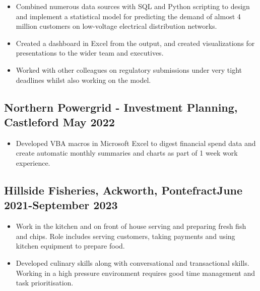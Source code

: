\documentclass[9pt]{extarticle}
\begin{document}
\begin{minipage}{0.65\textwidth}
	\begin{itemize}
		\item Combined numerous data sources with SQL and Python scripting to design and implement a statistical model for predicting the demand of almost 4 million customers on low-voltage electrical distribution networks.\vspace{-.1cm}
		\item Created a dashboard in Excel from the output, and created visualizations for presentations to the wider team and executives. \vspace{-.1cm}
		\item Worked with other colleagues on regulatory submissions under very tight deadlines whilst also working on the model.
	\end{itemize}

	\vspace{-.5cm}




	\subsection{Northern Powergrid - Investment Planning, Castleford \hfill May 2022}
	\begin{itemize}
		\item Developed VBA macros in Microsoft Excel to digest financial spend data and create automatic monthly summaries and charts as part of 1 week work experience.
	\end{itemize}
	\vspace{-.5cm}



	\subsection{Hillside Fisheries, Ackworth, Pontefract\hfill June 2021-September 2023}
	\vspace{-.1cm}
	\begin{itemize}
		\item Work in the kitchen and on front of house serving and preparing fresh fish and chips. Role includes serving customers, taking payments and using kitchen equipment to prepare food.
		      \vspace{-.1cm}
		\item Developed culinary skills along with conversational and transactional skills. Working in a high pressure environment requires good time management and task prioritisation.
	\end{itemize}
	\vspace{-.5cm}





\end{minipage}
\end{document}

